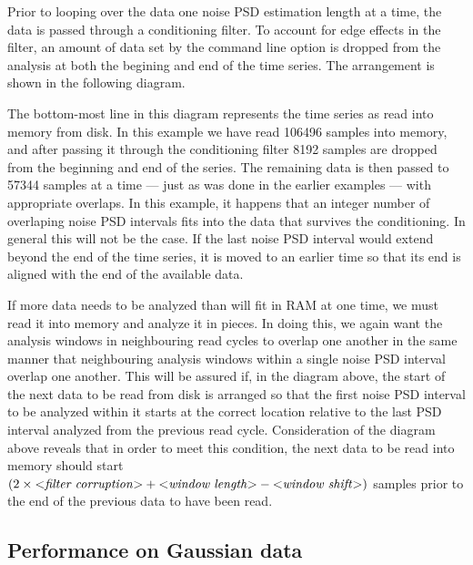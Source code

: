 Prior to looping over the data one noise PSD estimation length at a time,
the data is passed through a conditioning filter.  To account for edge
effects in the filter, an amount of data set by the command line option
 is dropped from the analysis at both the
begining and end of the time series.  The arrangement is shown in the
following diagram.
\begin{center}

\end{center}
The bottom-most line in this diagram represents the time series as read
into memory from disk.  In this example we have read 106496 samples into
memory, and after passing it through the conditioning filter 8192 samples
are dropped from the beginning and end of the series.  The remaining data
is then passed to  57344 samples at a time --- just as
was done in the earlier examples --- with appropriate overlaps.  In this
example, it happens that an integer number of overlaping noise PSD
intervals fits into the data that survives the conditioning.  In general
this will not be the case.  If the last noise PSD interval would extend
beyond the end of the time series, it is moved to an earlier time so that
its end is aligned with the end of the available data.

If more data needs to be analyzed than will fit in RAM at one time, we must
read it into memory and analyze it in pieces.  In doing this, we again want
the analysis windows in neighbouring read cycles to overlap one another in
the same manner that neighbouring analysis windows within a single noise
PSD interval overlap one another.  This will be assured if, in the diagram
above, the start of the next data to be read from disk is arranged so that
the first noise PSD interval to be analyzed within it starts at the correct
location relative to the last PSD interval analyzed from the previous read
cycle.  Consideration of the diagram above reveals that in order to meet
this condition, the next data to be read into memory should start $(2
\times \mbox{$<$\textit{filter corruption}$>$} + \mbox{$<$\textit{window length}$>$} -
\mbox{$<$\textit{window shift}$>$})$ samples prior to the end of the previous data
to have been read.

\subsection{Performance on Gaussian data}
\label{section:Gaussian}

